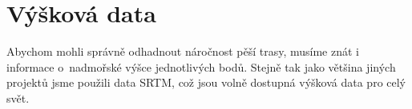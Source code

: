 \chapter{Výšková data}
Abychom mohli správně odhadnout náročnost pěší trasy, musíme znát i informace
o~nadmořské výšce jednotlivých bodů. Stejně tak jako většina jiných projektů jsme
použili data SRTM\cite{srtmweb}, což jsou volně dostupná výšková data pro celý
svět. %
